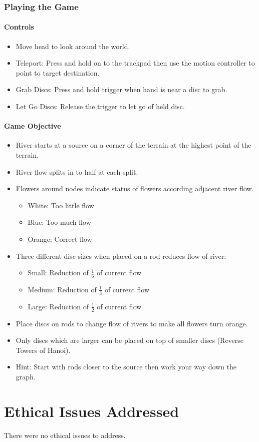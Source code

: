 \begin{appendices}
\subsection{Playing the Game}

\subsubsection{Controls}

\begin{itemize}
	\item Move head to look around the world.
	\item Teleport: Press and hold on to the trackpad then use the motion controller to point to target destination.
	\item Grab Discs: Press and hold trigger when hand is near a disc to grab.
	\item Let Go Discs: Release the trigger to let go of held disc.
\end{itemize}

\subsubsection{Game Objective}

\begin{itemize}
	\item River starts at a source on a corner of the terrain at the highest point of the terrain.
	\item River flow splits in to half at each split.
	\item Flowers around nodes indicate status of flowers according adjacent river flow.
	\begin{itemize}
		\item White: Too little flow
		\item Blue: Too much flow
		\item Orange: Correct flow
	\end{itemize}
	\item Three different disc sizes when placed on a rod reduces flow of river:
	\begin{itemize}
		\item Small: Reduction of \(\frac{1}{6}\) of current flow
		\item Medium: Reduction of \(\frac{1}{3}\) of current flow
		\item Large: Reduction of \(\frac{1}{2}\) of current flow
	\end{itemize}
	\item Place discs on rods to change flow of rivers to make all flowers turn orange.
	\item Only discs which are larger can be placed on top of smaller discs (Reverse Towers of Hanoi).
	\item Hint: Start with rods closer to the source then work your way down the graph.
\end{itemize}
\chapter{Ethical Issues Addressed}
There were no ethical issues to address.
\end{appendices}